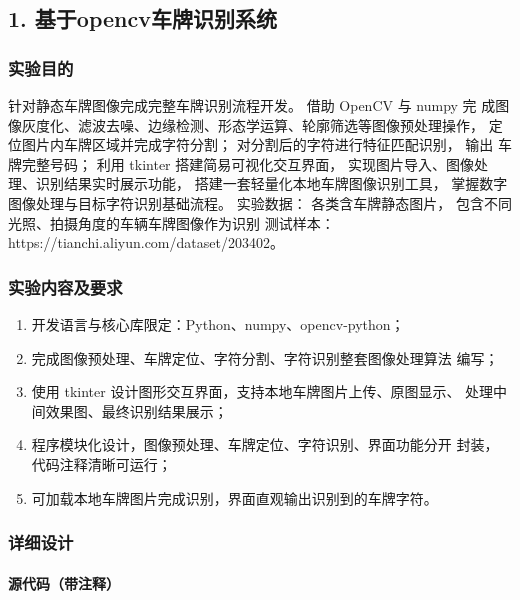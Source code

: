 \documentclass{ctexart}
\begin{document}
\subsection{1. 基于opencv车牌识别系统}
\subsubsection{实验目的}
针对静态车牌图像完成完整车牌识别流程开发。
借助 OpenCV 与 numpy 完 成图像灰度化、滤波去噪、边缘检测、形态学运算、轮廓筛选等图像预处理操作， 
定位图片内车牌区域并完成字符分割；
对分割后的字符进行特征匹配识别，
输出 车牌完整号码；
利用 tkinter 搭建简易可视化交互界面，
实现图片导入、图像处 理、识别结果实时展示功能，
搭建一套轻量化本地车牌图像识别工具，
掌握数字 图像处理与目标字符识别基础流程。 
实验数据： 各类含车牌静态图片，
包含不同光照、拍摄角度的车辆车牌图像作为识别
测试样本：https://tianchi.aliyun.com/dataset/203402。

\subsubsection{实验内容及要求}

\begin{enumerate}
    \item 开发语言与核心库限定：Python、numpy、opencv-python；
    \item 完成图像预处理、车牌定位、字符分割、字符识别整套图像处理算法 编写；
    \item 使用 tkinter 设计图形交互界面，支持本地车牌图片上传、原图显示、 处理中间效果图、最终识别结果展示；
    \item 程序模块化设计，图像预处理、车牌定位、字符识别、界面功能分开 封装，代码注释清晰可运行；
    \item 可加载本地车牌图片完成识别，界面直观输出识别到的车牌字符。
    
\end{enumerate}




\subsubsection{详细设计}
\paragraph{源代码（带注释）}
\end{document}
